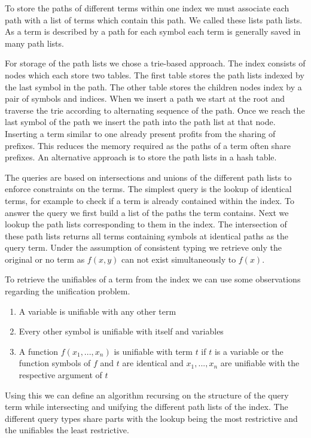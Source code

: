 To store the paths of different terms within one index we must associate each path with a list of terms which contain this path. We called these lists path lists. As a term is described by a path for each symbol each term is generally saved in many path lists.

For storage of the path lists we chose a trie-based approach. The index consists of nodes which each store two tables. The first table stores the path lists indexed by the last symbol in the path. The other table stores the children nodes index by a pair of symbols and indices. When we insert a path we start at the root and traverse the trie according to alternating sequence of the path. Once we reach the last symbol of the path we insert the path into the path list at that node. Inserting a term similar to one already present profits from the sharing of prefixes. This reduces the memory required as the paths of a term often share prefixes. An alternative approach is to store the path lists in a hash table.

The queries are based on intersections and unions of the different path lists to enforce constraints on the terms. The simplest query is the lookup of identical terms, for example to check if a term is already contained within the index. To answer the query we first build a list of the paths the term contains. Next we lookup the path lists corresponding to them in the index. The intersection of these path lists returns all terms containing symbols at identical paths as the query term. Under the assumption of consistent typing we retrieve only the original or no term as $f(x,y)$ can not exist simultaneously to $f(x)$.

To retrieve the unifiables of a term from the index we can use some observations regarding the unification problem.
\begin{enumerate}
  \item A variable is unifiable with any other term
  \item Every other symbol is unifiable with itself and variables
  \item A function $f(x_{1},...,x_{n})$ is unifiable with term $t$ if $t$ is a variable or the function symbols of $f$ and $t$ are identical and $x_{1},...,x_{n}$ are unifiable with the respective argument of $t$
\end{enumerate}
Using this we can define an algorithm recursing on the structure of the query term while intersecting and unifying the different path lists of the index. The different query types share parts with the lookup being the most restrictive and the unifiables the least restrictive.

